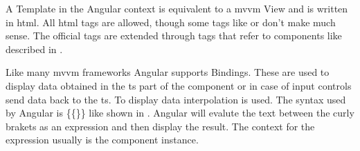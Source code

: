 A Template in the Angular context is equivalent to a \gls{mvvm} View and is written in \gls{html}. All \gls{html} tags are allowed, though some tags like  or  don't make much sense. The official tags are extended through tags that refer to components like described in .


Like many \gls{mvvm} frameworks Angular supports Bindings. These are used to display data obtained in the \gls{ts} part of the component or in case of input controls send data back to the \gls{ts}. To display data interpolation is used. The syntax used by Angular is \{\{\}\} like shown in . Angular will evalute the text between the curly brakets as an expression and then display the result. The context for the expression usually is the component instance.

\cite{angularTemplateSyntax}



